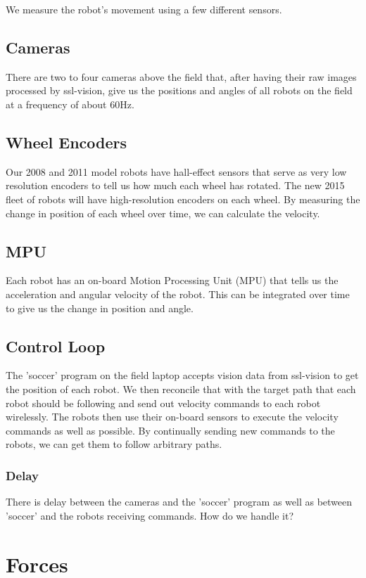 \documentclass{article}
\begin{document}
We measure the robot's movement using a few different sensors.

\subsection*{Cameras}
There are two to four cameras above the field that, after having their raw images processed by ssl-vision, give us the positions and angles of all robots on the field at a frequency of about 60Hz.

\subsection*{Wheel Encoders}
Our 2008 and 2011 model robots have hall-effect sensors that serve as very low resolution encoders to tell us how much each wheel has rotated.
The new 2015 fleet of robots will have high-resolution encoders on each wheel.
By measuring the change in position of each wheel over time, we can calculate the velocity.

\subsection*{MPU}
Each robot has an on-board Motion Processing Unit (MPU) that tells us the acceleration and angular velocity of the robot.  This can be integrated over time to give us the change in position and angle.


\subsection*{Control Loop}
The 'soccer' program on the field laptop accepts vision data from ssl-vision to get the position of each robot.  We then reconcile that with the target path that each robot should be following and send out velocity commands to each robot wirelessly.  The robots then use their on-board sensors to execute the velocity commands as well as possible.  By continually sending new commands to the robots, we can get them to follow arbitrary paths.

\subsubsection*{Delay}
There is delay between the cameras and the 'soccer' program as well as between 'soccer' and the robots receiving commands.  How do we handle it?


\section*{Forces}
\end{document}
